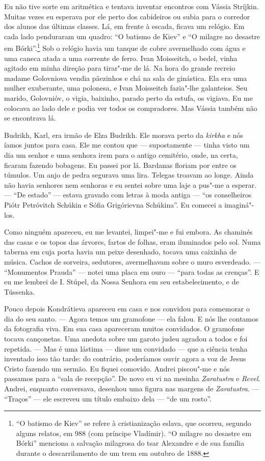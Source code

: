 Eu não tive sorte em aritmética e tentava inventar encontros com Vássia
Stríjkin. Muitas vezes eu esperava por ele perto dos cabideiros ou subia
para o corredor dos alunos das últimas classes. Lá, em frente à escada,
ficava um relógio. Em cada lado penduraram um quadro: ``O batismo de
Kiev'' e ``O milagre no desastre em Bórki''.\footnote{``O batismo de
  Kiev'' se refere à cristianização eslava, que ocorreu, segundo alguns
  relatos, em 988 (com príncipe Vladímir). ``O milagre no desastre em
  Bórki'' menciona a salvação milagrosa do tsar Alexandre \scalebox{.8}{III} e de sua
  família durante o descarrilamento de um trem em outubro de 1888.} Sob
o relógio havia um tanque de cobre avermelhado com água e uma caneca
atada a uma corrente de ferro. Ivan Moisseitch, o bedel, vinha agitado
em minha direção para tirar"-me de lá. Na hora do grande recreio madame
Golovniova vendia pãezinhos e chá na sala de ginástica. Ela era uma
mulher exuberante, uma polonesa, e Ivan Moisseitch fazia"-lhe galanteios.
Seu marido, Golovnióv, o vigia, baixinho, parado perto da estufa, os
vigiava. Eu me colocava ao lado dele e podia ver todos os compradores.
Mas Vássia também não se encontrava lá.

Budrikh, Karl, era irmão de Elza Budrikh. Ele morava perto da
\emph{kirkha} e nós íamos juntos para casa. Ele me contou que ---
supostamente --- tinha visto um dia um senhor e uma senhora irem para o
antigo cemitério, onde, na certa, ficaram fazendo bobagens. Eu passei
por lá. Bardanas floriam por entre os túmulos. Um anjo de pedra segurava
uma lira. Telegas troavam ao longe. Ainda não havia senhores nem
senhoras e eu sentei sobre uma laje a pus"-me a esperar. --- ``De
estado'' --- estava gravado com letras à moda antiga --- ``os
conselheiros Piótr Petróvitch Schúkin e Sófia Grigórievna Schúkina''. Eu
comecei a imaginá"-los.

Como ninguém apareceu, eu me levantei, limpei"-me e fui embora. As
chaminés das casas e os topos das árvores, fartos de folhas, eram
iluminados pelo sol. Numa taberna em cuja porta havia um peixe
desenhado, tocava uma caixinha de música. Cachos de sorveira, sedutores,
avermelhavam sobre o muro esverdeado. --- ``Monumentos Prauda'' ---
notei uma placa em ouro --- ``para todas as crenças''. E eu me lembrei
de I. Stúpel, da Nossa Senhora em seu estabelecimento, e de Tússenka.

Pouco depois Kondrátieva apareceu em casa e nos convidou para comemorar
o dia do seu santo. --- Agora temos um gramofone --- ela falou. E nós
lhe contamos da fotografia viva. Em sua casa apareceram muitos
convidados. O gramofone tocava cançonetas. Uma anedota sobre um garoto
judeu agradou a todos e foi repetida. --- Mas é uma lástima --- disse um
convidado --- que a ciência tenha inventado isso tão tarde: do
contrário, poderíamos ouvir agora a voz de Jesus Cristo fazendo um
sermão. Eu fiquei comovido. Andrei piscou"-me e nós passamos para a
``sala de recepção''. De novo eu vi na mesinha \emph{Zaratustra} e
\emph{Revel}. Andrei, enquanto conversava, desenhou uma figura nas
margens de \emph{Zaratustra}. --- ``Traços'' --- ele escreveu um título
embaixo dela --- ``de um rosto''.

